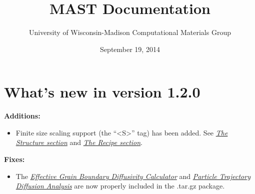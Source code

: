 \documentclass[letterpaper,10pt,english]{sphinxmanual}
\title{MAST Documentation}
\date{September 19, 2014}
\author{University of Wisconsin-Madison Computational Materials Group}
\begin{document}
\maketitle
\tableofcontents
{}\label{index::doc}



\chapter{What's new in version 1.2.0}
\label{16_0_whatsnew::doc}\label{16_0_whatsnew:what-s-new-in-version-1-2-0}\label{16_0_whatsnew:materials-simulation-toolkit-mast-manual}
\textbf{Additions:}
\begin{itemize}
\item {} 
Finite size scaling support (the ``\textless{}S\textgreater{}'' tag) has been added. See {\hyperref[3_1_1_structure::doc]{\emph{The Structure section}}} and {\hyperref[3_1_3_recipe::doc]{\emph{The Recipe section}}}.

\end{itemize}

\textbf{Fixes:}
\begin{itemize}
\item {} 
The {\hyperref[8_0_2_gbdiff::doc]{\emph{Effective Grain Boundary Diffusivity Calculator}}} and {\hyperref[8_0_3_diffanalyzer::doc]{\emph{Particle Trajectory Diffusion Analysis}}} are now properly included in the .tar.gz package.

\end{itemize}
\end{document}
